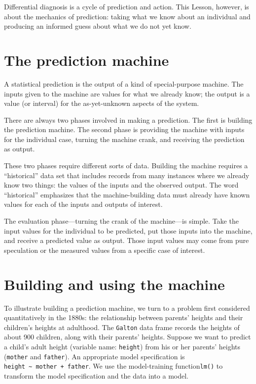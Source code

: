 \documentclass[
  letterpaper,
  DIV=11,
  numbers=noendperiod,
  oneside]{scrreprt}
\begin{document}
Differential diagnosis is a cycle of prediction and action. This Lesson,
however, is about the mechanics of prediction: taking what we know about
an individual and producing an informed guess about what we do not yet
know.

\hypertarget{the-prediction-machine}{%
\section{The prediction machine}\label{the-prediction-machine}}

A statistical prediction is the output of a kind of special-purpose
machine. The inputs given to the machine are values for what we already
know; the output is a value (or interval) for the as-yet-unknown aspects
of the system.

There are always two phases involved in making a prediction. The first
is building the prediction machine. The second phase is providing the
machine with inputs for the individual case, turning the machine crank,
and receiving the prediction as output.

These two phases require different sorts of data. Building the machine
requires a ``historical'' data set that includes records from many
instances where we already know two things: the values of the inputs and
the observed output. The word ``historical'' emphasizes that the
machine-building data must already have known values for each of the
inputs and outputs of interest.

The evaluation phase---turning the crank of the machine---is simple.
Take the input values for the individual to be predicted, put those
inputs into the machine, and receive a predicted value as output. Those
input values may come from pure speculation or the measured values from
a specific case of interest.

\hypertarget{building-and-using-the-machine}{%
\section{Building and using the
machine}\label{building-and-using-the-machine}}

To illustrate building a prediction machine, we turn to a problem first
considered quantitatively in the 1880s: the relationship between
parents' heights and their children's heights at adulthood. The
\texttt{Galton} data frame records the heights of about 900 children,
along with their parents' heights. Suppose we want to predict a child's
adult height (variable name: \texttt{height}) from his or her parents'
heights (\texttt{mother} and \texttt{father}). An appropriate model
specification is \texttt{height\ \textasciitilde{}\ mother\ +\ father}.
We use the model-training function\texttt{lm()} to transform the model
specification and the data into a model.
\end{document}
